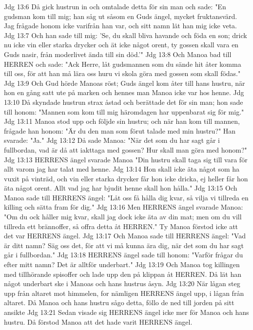 Jdg 13:6  Då gick hustrun in och omtalade detta för sin man och sade: "En gudsman kom till mig; han såg ut såsom en Guds ängel, mycket fruktansvärd. Jag frågade honom icke varifrån han var, och sitt namn lät han mig icke veta.
Jdg 13:7  Och han sade till mig: 'Se, du skall bliva havande och föda en son; drick nu icke vin eller starka drycker och ät icke något orent, ty gossen skall vara en Guds nasir, från moderlivet ända till sin död.'"
Jdg 13:8  Och Manoa bad till HERREN och sade: "Ack Herre, låt gudsmannen som du sände hit åter komma till oss, för att han må lära oss huru vi skola göra med gossen som skall födas."
Jdg 13:9  Och Gud hörde Manoas röst; Guds ängel kom åter till hans hustru, när hon en gång satt ute på marken och hennes man Manoa icke var hos henne.
Jdg 13:10  Då skyndade hustrun strax åstad och berättade det för sin man; hon sade till honom: "Mannen som kom till mig häromdagen har uppenbarat sig för mig."
Jdg 13:11  Manoa stod upp och följde sin hustru; och när han kom till mannen, frågade han honom: "Är du den man som förut talade med min hustru?" Han svarade: "Ja."
Jdg 13:12  Då sade Manoa: "När det som du har sagt går i fullbordan, vad är då att iakttaga med gossen? Hur skall man göra med honom?"
Jdg 13:13  HERRENS ängel svarade Manoa "Din hustru skall taga sig till vara för allt varom jag har talat med henne.
Jdg 13:14  Hon skall icke äta något som ha vuxit på vinträd, och vin eller starka drycker får hon icke dricka, ej heller får hon äta något orent. Allt vad jag har bjudit henne skall hon hålla."
Jdg 13:15  Och Manoa sade till HERRENS ängel: "Låt oss få hålla dig kvar, så vilja vi tillreda en killing och sätta fram för dig."
Jdg 13:16  Men HERRENS ängel svarade Manoa: "Om du ock håller mig kvar, skall jag dock icke äta av din mat; men om du vill tillreda ett brännoffer, så offra detta åt HERREN." Ty Manoa förstod icke att det var HERRENS ängel.
Jdg 13:17  Och Manoa sade till HERRENS ängel: "Vad är ditt namn? Säg oss det, för att vi må kunna ära dig, när det som du har sagt går i fullbordan."
Jdg 13:18  HERRENS ängel sade till honom: "Varför frågar du efter mitt namn? Det är alltför underbart."
Jdg 13:19  Och Manoa tog killingen med tillhörande spisoffer och lade upp den på klippan åt HERREN. Då lät han något underbart ske i Manoas och hans hustrus åsyn.
Jdg 13:20  När lågan steg upp från altaret mot himmelen, for nämligen HERRENS ängel upp, i lågan från altaret. Då Manoa och hans hustru sågo detta, föllo de ned till jorden på sitt ansikte
Jdg 13:21  Sedan visade sig HERRENS ängel icke mer för Manoa och hans hustru. Då förstod Manoa att det hade varit HERRENS ängel.
